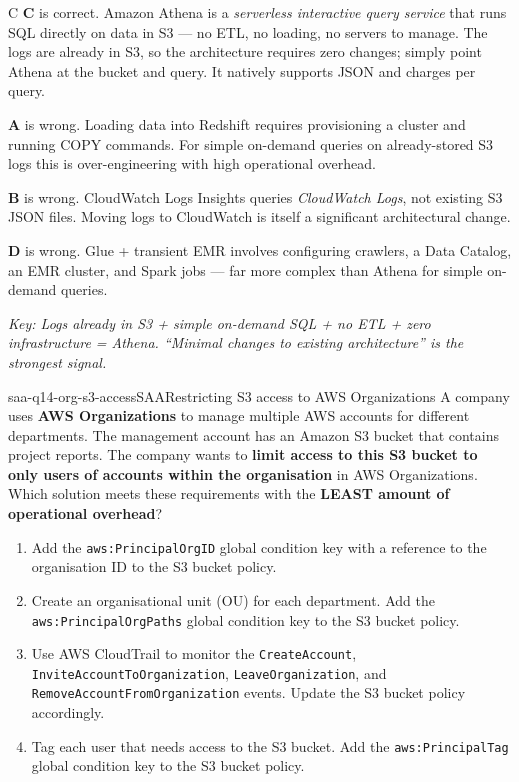 \begin{answer}{C}
\textbf{C} is correct. Amazon Athena is a \emph{serverless interactive query service} that runs SQL directly on data in S3 --- no ETL, no loading, no servers to manage. The logs are already in S3, so the architecture requires zero changes; simply point Athena at the bucket and query. It natively supports JSON and charges per query.

\textbf{A} is wrong. Loading data into Redshift requires provisioning a cluster and running COPY commands. For simple on-demand queries on already-stored S3 logs this is over-engineering with high operational overhead.

\textbf{B} is wrong. CloudWatch Logs Insights queries \emph{CloudWatch Logs}, not existing S3 JSON files. Moving logs to CloudWatch is itself a significant architectural change.

\textbf{D} is wrong. Glue + transient EMR involves configuring crawlers, a Data Catalog, an EMR cluster, and Spark jobs --- far more complex than Athena for simple on-demand queries.

\textit{Key: Logs already in S3 + simple on-demand SQL + no ETL + zero infrastructure = Athena. ``Minimal changes to existing architecture'' is the strongest signal.}
\end{answer}


\begin{question}{saa-q14-org-s3-access}{SAA}{Restricting S3 access to AWS Organizations}
A company uses \textbf{AWS Organizations} to manage multiple AWS accounts for different departments.
The management account has an Amazon S3 bucket that contains project reports.
The company wants to \textbf{limit access to this S3 bucket to only users of accounts within the organisation} in AWS Organizations.
Which solution meets these requirements with the \textbf{LEAST amount of operational overhead}?

\begin{enumerate}[label=\Alph*.]
  \item Add the \texttt{aws:PrincipalOrgID} global condition key with a reference to the organisation ID to the S3 bucket policy.
  \item Create an organisational unit (OU) for each department.
        Add the \texttt{aws:PrincipalOrgPaths} global condition key to the S3 bucket policy.
  \item Use AWS CloudTrail to monitor the \texttt{CreateAccount}, \texttt{InviteAccountToOrganization}, \texttt{LeaveOrganization}, and \texttt{RemoveAccountFromOrganization} events.
        Update the S3 bucket policy accordingly.
  \item Tag each user that needs access to the S3 bucket.
        Add the \texttt{aws:PrincipalTag} global condition key to the S3 bucket policy.
\end{enumerate}
\end{question}

